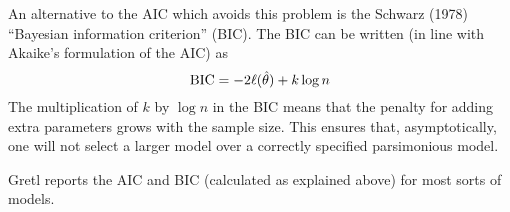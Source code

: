 An alternative to the AIC which avoids this problem is the Schwarz
(1978) ``Bayesian information criterion'' (BIC).  The BIC can be
written (in line with Akaike's formulation of the AIC) as
%
\[
{\rm BIC} = -2 \ell(\hat{\theta}) + k \log n
\]
The multiplication of $k$ by $\log n$ in the BIC means that the
penalty for adding extra parameters grows with the sample size.  This
ensures that, asymptotically, one will not select a larger model over
a correctly specified parsimonious model.

\vspace{1ex}

Gretl reports the AIC and BIC (calculated as explained above) for most
sorts of models.





